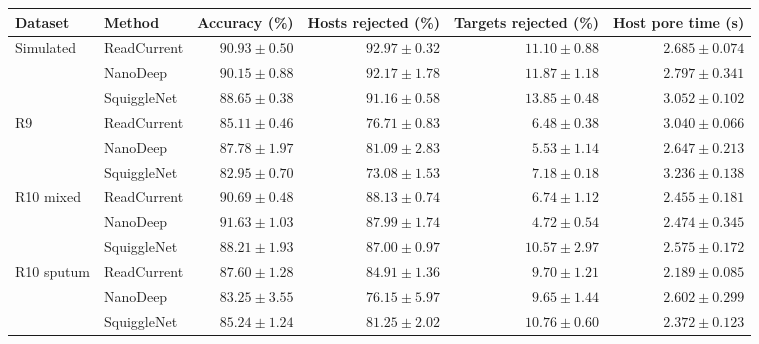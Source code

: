 \begin{tabular}{@{}llrrrr@{}}
\toprule
Dataset & Method & Accuracy (\%) & Hosts rejected (\%) & Targets rejected (\%) & Host pore time (s)\\\midrule
Simulated & ReadCurrent & $90.93 \pm 0.50$ & $92.97 \pm 0.32$ & $11.10 \pm 0.88$ & $2.685 \pm 0.074$\\
 & NanoDeep & $90.15 \pm 0.88$ & $92.17 \pm 1.78$ & $11.87 \pm 1.18$ & $2.797 \pm 0.341$\\
 & SquiggleNet & $88.65 \pm 0.38$ & $91.16 \pm 0.58$ & $13.85 \pm 0.48$ & $3.052 \pm 0.102$\\
\addlinespace
R9 & ReadCurrent & $85.11 \pm 0.46$ & $76.71 \pm 0.83$ & $6.48 \pm 0.38$ & $3.040 \pm 0.066$\\
 & NanoDeep & $87.78 \pm 1.97$ & $81.09 \pm 2.83$ & $5.53 \pm 1.14$ & $2.647 \pm 0.213$\\
 & SquiggleNet & $82.95 \pm 0.70$ & $73.08 \pm 1.53$ & $7.18 \pm 0.18$ & $3.236 \pm 0.138$\\
\addlinespace
R10 mixed & ReadCurrent & $90.69 \pm 0.48$ & $88.13 \pm 0.74$ & $6.74 \pm 1.12$ & $2.455 \pm 0.181$\\
 & NanoDeep & $91.63 \pm 1.03$ & $87.99 \pm 1.74$ & $4.72 \pm 0.54$ & $2.474 \pm 0.345$\\
 & SquiggleNet & $88.21 \pm 1.93$ & $87.00 \pm 0.97$ & $10.57 \pm 2.97$ & $2.575 \pm 0.172$\\
\addlinespace
R10 sputum & ReadCurrent & $87.60 \pm 1.28$ & $84.91 \pm 1.36$ & $9.70 \pm 1.21$ & $2.189 \pm 0.085$\\
 & NanoDeep & $83.25 \pm 3.55$ & $76.15 \pm 5.97$ & $9.65 \pm 1.44$ & $2.602 \pm 0.299$\\
 & SquiggleNet & $85.24 \pm 1.24$ & $81.25 \pm 2.02$ & $10.76 \pm 0.60$ & $2.372 \pm 0.123$\\
\bottomrule
\end{tabular}
